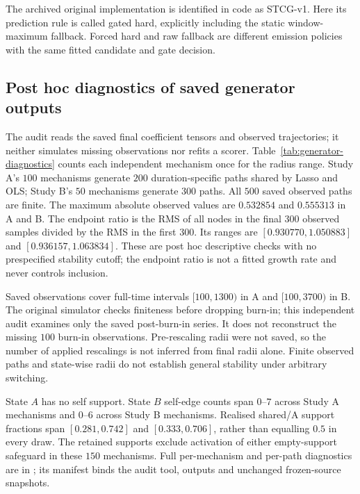 \documentclass[11pt]{article}
\begin{document}
The archived original implementation is identified in code as STCG-v1.
Here its prediction rule is called gated hard, explicitly including the
static window-maximum fallback. Forced hard and raw fallback are different
emission policies with the same fitted candidate and gate decision.

\subsection{Post hoc diagnostics of saved generator outputs}
\label{app:generator-audit}
The audit reads the saved final coefficient tensors and observed trajectories;
it neither simulates missing observations nor refits a scorer.
Table~\ref{tab:generator-diagnostics} counts each independent mechanism once
for the radius range. Study A's $100$ mechanisms generate $200$ duration-specific
paths shared by Lasso and OLS; Study B's $50$ mechanisms generate $300$ paths.
All $500$ saved observed paths are finite. The maximum absolute observed values
are $0.532854$ and $0.555313$ in A and B. The endpoint ratio is the RMS of all
nodes in the final $300$ observed samples divided by the RMS in the first
$300$. Its ranges are $[0.930770,1.050883]$ and $[0.936157,1.063834]$.
These are post hoc descriptive checks with no prespecified stability cutoff;
the endpoint ratio is not a fitted growth rate and never controls inclusion.

Saved observations cover full-time intervals $[100,1300)$ in A and
$[100,3700)$ in B. The original simulator checks finiteness before dropping
burn-in; this independent audit examines only the saved post-burn-in series.
It does not reconstruct the missing $100$ burn-in observations. Pre-rescaling
radii were not saved, so the number of applied rescalings is not inferred from
final radii alone. Finite observed paths and state-wise radii do not establish
general stability under arbitrary switching.

State $A$ has no self support. State $B$ self-edge counts span $0$--$7$ across Study A
mechanisms and $0$--$6$ across Study B mechanisms. Realised shared/A support
fractions span $[0.281,0.742]$ and $[0.333,0.706]$, rather than equalling $0.5$
in every draw. The retained supports exclude activation of either empty-support
safeguard in these $150$ mechanisms. Full per-mechanism and per-path diagnostics
are in ; its manifest binds
the audit tool, outputs and unchanged frozen-source snapshots.

\begin{table}[!htbp]
\centering
\caption{Post hoc diagnostics of retained generator outputs. Radius ranges
use final companion matrices; paths are paired within mechanism and are not
independent mechanism replicates. RMS uses the first/last 300 saved observed
samples and all nodes. No numerical cutoff or sample selection is introduced.}
\label{tab:generator-diagnostics}
\resizebox{\linewidth}{!}{}
\end{table}
\end{document}
